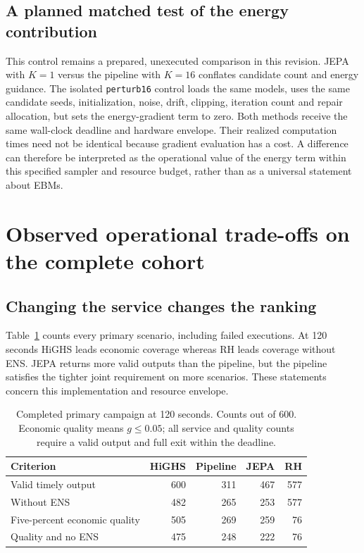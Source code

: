 \subsection{A planned matched test of the energy contribution}
This control remains a prepared, unexecuted comparison in this revision.
JEPA with $K=1$ versus the pipeline with $K=16$ conflates candidate count and
energy guidance. The isolated \texttt{perturb16} control loads the same models,
uses the same candidate seeds, initialization, noise, drift, clipping, iteration
count and repair allocation, but sets the energy-gradient term to zero. Both
methods receive the same wall-clock deadline and hardware envelope. Their
realized computation times need not be identical because gradient evaluation
has a cost. A difference can therefore be interpreted as the operational value
of the energy term within this specified sampler and resource budget, rather
than as a universal statement about EBMs.

\section{Observed operational trade-offs on the complete cohort}
\subsection{Changing the service changes the ranking}
Table~\ref{tab:final_aggregate} counts every primary scenario, including failed
executions. At 120 seconds HiGHS leads economic coverage whereas RH leads
coverage without ENS. JEPA returns more valid outputs than the pipeline,
but the pipeline satisfies the tighter joint requirement on more scenarios.
These statements concern this implementation and resource envelope.

\begin{table}[htbp]\centering\small
\caption{Completed primary campaign at 120 seconds. Counts out of 600.
Economic quality means $g\leq0.05$; all service and quality counts require
a valid output and full exit within the deadline.}
\label{tab:final_aggregate}
\begin{tabular}{lrrrr}\toprule
Criterion & HiGHS & Pipeline & JEPA & RH\\\midrule
Valid timely output & 600 & 311 & 467 & 577\\
Without ENS & 482 & 265 & 253 & 577\\
Five-percent economic quality & 505 & 269 & 259 & 76\\
Quality and no ENS & 475 & 248 & 222 & 76\\\bottomrule
\end{tabular}
\end{table}

